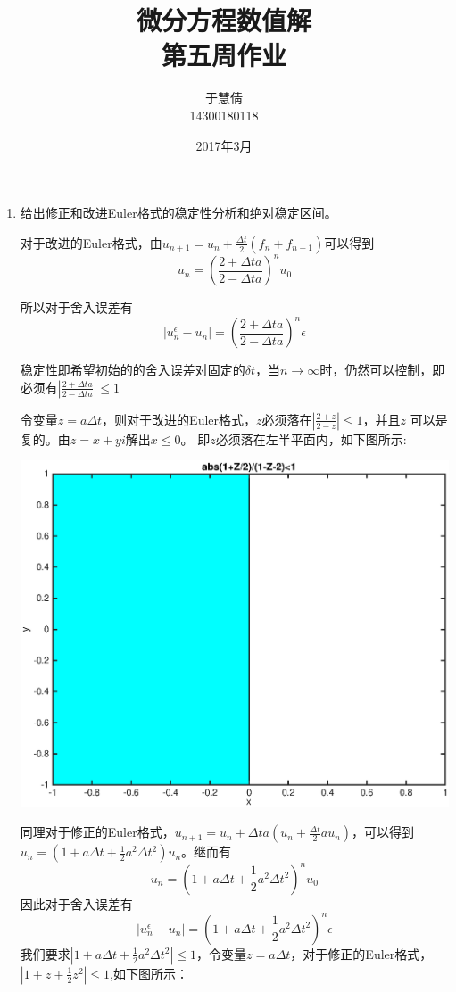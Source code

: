 \documentclass{ctexart}
\title{微分方程数值解 \\ 第五周作业}
\author{于慧倩 \\ 14300180118}
\date{2017年3月}
\begin{document}
\maketitle

\newpage

\begin{enumerate}
\item
给出修正和改进Euler格式的稳定性分析和绝对稳定区间。

对于改进的Euler格式，由\(u_{n+1}=u_n+ \frac{\Delta t}{2}(f_n+f_{n+1})\)可以得到
\[ u_n=(\frac{2+\Delta t a }{2-\Delta t a})^n u_0\]

 所以对于舍入误差有
 \[ |u_n^\epsilon -u_n|=(\frac{2+\Delta t a }{2-\Delta t a})^n \epsilon \]
 
 稳定性即希望初始的的舍入误差对固定的\(\delta t\)，当\(n \rightarrow \infty\)时，仍然可以控制，即必须有\( |\frac{2+\Delta ta }{2- \Delta ta}| \leq 1 \)
 
 
令变量\(z=a \Delta t\)，则对于改进的Euler格式，\(z\)必须落在\(|\frac{2+z }{2-z}| \leq 1\)，并且\(z\) 可以是复的。由\(z=x+yi\)解出\(x \leq 0\)。
 即\(z\)必须落在左半平面内，如下图所示:
 
 \centerline{\includegraphics[width=5.5in]{5.eps}}
 
 同理对于修正的Euler格式，\( u_{n+1}=u_n+\Delta t a(u_n+ \frac{\Delta t}{2}au_n)\)，可以得到\(u_n=(1+a\Delta t +\frac{1}{2}a^2\Delta t^2)u_n\)。继而有
 \[ u_n=(1+a\Delta t +\frac{1}{2}a^2\Delta t^2)^nu_0\]
 因此对于舍入误差有
 \[ |u_n^\epsilon -u_n| =(1+a\Delta t +\frac{1}{2}a^2\Delta t^2)^n \epsilon\]
 我们要求\(|1+a\Delta t +\frac{1}{2}a^2\Delta t^2| \leq 1\)，令变量\(z=a \Delta t\)，对于修正的Euler格式，\(|1+z +\frac{1}{2}z^2| \leq 1\),如下图所示：
 

\end{enumerate}
\end{document}
